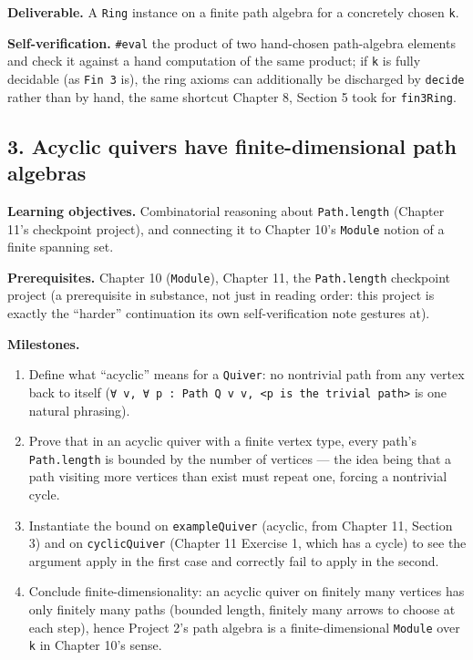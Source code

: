 \textbf{Deliverable.} A \texttt{Ring} instance on a finite path algebra for a concretely chosen \texttt{k}.

\textbf{Self-verification.} \texttt{\#eval} the product of two hand-chosen path-algebra elements and check it against a hand computation of the same product; if \texttt{k} is fully decidable (as \texttt{Fin 3} is), the ring axioms can additionally be discharged by \texttt{decide} rather than by hand, the same shortcut Chapter 8, Section 5 took for \texttt{fin3Ring}.

\subsection{3. Acyclic quivers have finite-dimensional path algebras}\label{sec:13-next-steps:03-next-projects:4}

\textbf{Learning objectives.} Combinatorial reasoning about \texttt{Path.length} (Chapter 11's checkpoint project), and connecting it to Chapter 10's \texttt{Module} notion of a finite spanning set.

\textbf{Prerequisites.} Chapter 10 (\texttt{Module}), Chapter 11, the \texttt{Path.length} checkpoint project (a prerequisite in substance, not just in reading order: this project is exactly the ``harder'' continuation its own self-verification note gestures at).

\textbf{Milestones.}

\begin{enumerate}
\def\labelenumi{\arabic{enumi}.}
\tightlist
\item
  Define what ``acyclic'' means for a \texttt{Quiver}: no nontrivial path from any vertex back to itself (\texttt{∀ v, ∀ p : Path Q v v, <p is the trivial path>} is one natural phrasing).
\item
  Prove that in an acyclic quiver with a finite vertex type, every path's \texttt{Path.length} is bounded by the number of vertices --- the idea being that a path visiting more vertices than exist must repeat one, forcing a nontrivial cycle.
\item
  Instantiate the bound on \texttt{exampleQuiver} (acyclic, from Chapter 11, Section 3) and on \texttt{cyclicQuiver} (Chapter 11 Exercise 1, which has a cycle) to see the argument apply in the first case and correctly fail to apply in the second.
\item
  Conclude finite-dimensionality: an acyclic quiver on finitely many vertices has only finitely many paths (bounded length, finitely many arrows to choose at each step), hence Project 2's path algebra is a finite-dimensional \texttt{Module} over \texttt{k} in Chapter 10's sense.
\end{enumerate}

